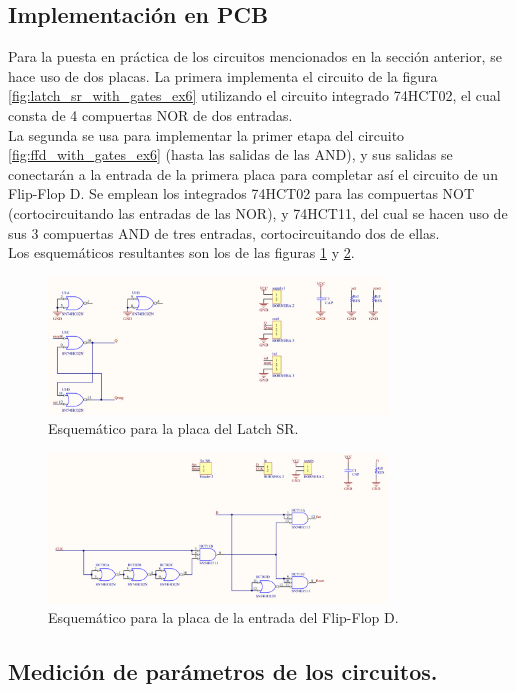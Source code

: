 \subsection{Implementación en PCB}
Para la puesta en práctica de los circuitos mencionados en la sección anterior, se hace uso de dos placas.
La primera implementa el circuito de la figura \ref{fig:latch_sr_with_gates_ex6} utilizando el circuito integrado 74HCT02, el cual consta de 4 compuertas NOR de dos entradas. \\
La segunda se usa para implementar la primer etapa del circuito \ref{fig:ffd_with_gates_ex6} (hasta las salidas de las AND), y sus salidas se conectarán a la entrada 
de la primera placa para completar así el circuito de un Flip-Flop D.
Se emplean los integrados 74HCT02 para las compuertas NOT (cortocircuitando las entradas de las NOR), y 74HCT11, del cual se hacen uso de sus 3 compuertas AND de tres 
entradas, cortocircuitando dos de ellas.\\
Los esquemáticos resultantes son los de las figuras \ref{fig:latch_sr_schematic_ex6} y \ref{fig:ffd_adapter_schematic_ex6}.

\begin{figure}[H]
    \centering
    \includegraphics[width=0.8\textwidth]{../EJ6/Recursos/latch_sr_schematic}
    \caption{Esquemático para la placa del Latch SR.}
    \label{fig:latch_sr_schematic_ex6}
\end{figure}

\begin{figure}[H]
    \centering
    \includegraphics[width=0.8\textwidth]{../EJ6/Recursos/ffd_adapter_schematic}
    \caption{Esquemático para la placa de la entrada del Flip-Flop D.}
    \label{fig:ffd_adapter_schematic_ex6}
\end{figure}



\subsection{Medición de parámetros de los circuitos.}